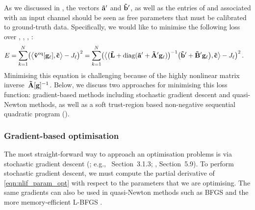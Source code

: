 As we discussed in , the vectors $\mathbf{\tilde a}'$ and $\mathbf{\tilde b}'$, as well as the entries of \mrAp and \mrBp associated with an input channel should be seen as free parameters that must be calibrated to ground-truth data.
Specifically, we would like to minimise the following loss over \vrap, \mrAp, \vrbp, \mrBp:
\begin{align}
	\begin{aligned}
	E %
	  &= \sum_{k = 1}^N \bigl(
	   	   	\bigl\langle
	   	   		\vreq[\vec g_\ell],
	   	   		\vrc
	   	   	\bigr\rangle
	   	   	 - J_\ell \bigr)^2
	  = \sum_{k = 1}^N \bigl(
	   	\bigl\langle
	   		\bigl(\mrL + \diag(\vrap + \mrAp \vec g_\ell) \bigr)^{-1} \bigl(\vrbp + \mrBp \vec g_\ell  \bigr),
	   		\vrc
	   	\bigr\rangle
	   	 - J_\ell \bigr)^2 \,.
	\end{aligned}
	\label{eqn:nlif_param_opt}	
\end{align}
Minimising this equation is challenging because of the highly nonlinear matrix inverse~$\mathbf{\tilde A}[\mathbf{g}]^{-1}$.
Below, we discuss two approaches for minimising this loss function: gradient-based methods including stochastic gradient descent and quasi-Newton methods, as well as a soft trust-region based non-negative sequential quadratic program (\SQP).

\subsubsection{Gradient-based optimisation}
The most straight-forward way to approach an optimisation problems is via stochastic gradient descent (\SGD; e.g., \cite{bishop2006pattern}~Section~3.1.3; \cite{goodfellow2016deep}, Section~5.9).
To perform stochastic gradient descent, we must compute the partial derivative of \cref{eqn:nlif_param_opt} with respect to the parameters that we are optimising.
The same gradients can also be used in quasi-Newton methods such as BFGS \citep[Chapter~2]{nocedal2006numerical} and the more memory-efficient L-BFGS \citep[Section~9.1]{nocedal2006numerical}.

